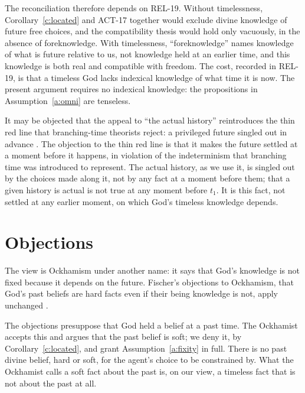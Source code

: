 \documentclass{situationist-preprint}
\begin{document}
The reconciliation therefore depends on REL-19. Without timelessness, Corollary~\ref{c:located} and ACT-17 together would exclude divine knowledge of future free choices, and the compatibility thesis would hold only vacuously, in the absence of foreknowledge. With timelessness, \enquote{foreknowledge} names knowledge of what is future relative to us, not knowledge held at an earlier time, and this knowledge is both real and compatible with freedom. The cost, recorded in REL-19, is that a timeless God lacks indexical knowledge of what time it is now. The present argument requires no indexical knowledge: the propositions in Assumption~\ref{a:omni} are tenseless.

It may be objected that the appeal to \enquote{the actual history} reintroduces the thin red line that branching-time theorists reject: a privileged future singled out in advance \citep{BelnapGreen1994}. The objection to the thin red line is that it makes the future settled at a moment before it happens, in violation of the indeterminism that branching time was introduced to represent. The actual history, as we use it, is singled out by the choices made along it, not by any fact at a moment before them; that a given history is actual is not true at any moment before $t_1$. It is this fact, not settled at any earlier moment, on which God's timeless knowledge depends.

\section{Objections}

\begin{objection}
The view is Ockhamism under another name: it says that God's knowledge is not fixed because it depends on the future. Fischer's objections to Ockhamism, that God's past beliefs are hard facts even if their being knowledge is not, apply unchanged \citep{Fischer1989}.
\end{objection}

\begin{reply}
The objections presuppose that God held a belief at a past time. The Ockhamist accepts this and argues that the past belief is soft; we deny it, by Corollary~\ref{c:located}, and grant Assumption~\ref{a:fixity} in full. There is no past divine belief, hard or soft, for the agent's choice to be constrained by. What the Ockhamist calls a soft fact about the past is, on our view, a timeless fact that is not about the past at all.
\end{reply}
\end{document}
